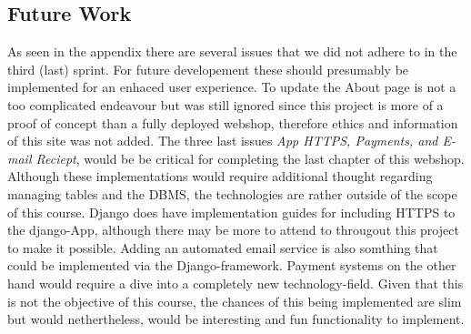 \subsection{Future Work} 

As seen in the appendix there are several issues that we did not adhere to in the third (last) sprint. For future developement these should presumably be implemented for an enhaced user experience. To update the About page is not a too complicated endeavour but was still ignored since this project is more of a proof of concept than a fully deployed webshop, therefore ethics and information of this site was not added. The three last issues \textit{App HTTPS, Payments, and E-mail Reciept}, would be be critical for completing the last chapter of this webshop. Although these implementations would require additional thought regarding managing tables and the DBMS, the technologies are rather outside of the scope of this course. Django does have implementation guides for including HTTPS to the django-App, although there may be more to attend to througout this project to make it possible. Adding an automated email service is also somthing that could be implemented via the Django-framework. Payment systems on the other hand would require a dive into a completely new technology-field. Given that this is not the objective of this course, the chances of this being implemented are slim but would nethertheless, would be interesting and fun functionality to implement. 

